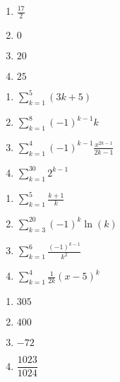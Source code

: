 \begin{multicols}{4} 
\begin{enumerate}
\setcounter{enumi}{\value{HW}}


\item $\frac{17}{2}$
\item $0$
\item  $20$
\item  $25$

\setcounter{HW}{\value{enumi}}
\end{enumerate}
\end{multicols}


\begin{multicols}{4} 
\begin{enumerate}
\setcounter{enumi}{\value{HW}}

\item $\displaystyle \sum_{k = 1}^{5} (3k + 5)$
\item $\displaystyle \sum_{k = 1}^{8} (-1)^{k - 1}k$
\item $\displaystyle \sum_{k = 1}^{4} (-1)^{k - 1} \frac{x^{2k - 1}}{2k - 1}$
\item $\displaystyle \sum_{k = 1}^{30} 2^{k-1}$

\setcounter{HW}{\value{enumi}}
\end{enumerate}
\end{multicols}


\begin{multicols}{4} 
\begin{enumerate}
\setcounter{enumi}{\value{HW}}


\item $\displaystyle \sum_{k = 1}^{5} \frac{k + 1}{k}$
\item $\displaystyle \sum_{k = 3}^{20} (-1)^{k} \ln(k)$
\item $\displaystyle \sum_{k = 1}^{6} \frac{(-1)^{k - 1}}{k^{2}}$
\item $\displaystyle \sum_{k = 1}^{4} \frac{1}{2k}(x - 5)^{k}$

\setcounter{HW}{\value{enumi}}
\end{enumerate}
\end{multicols}


\begin{multicols}{4} 
\begin{enumerate}
\setcounter{enumi}{\value{HW}}

\item $305$

\item  $400$

\item  $-72$

\item $\dfrac{1023}{1024}$

\setcounter{HW}{\value{enumi}}
\end{enumerate}
\end{multicols}

